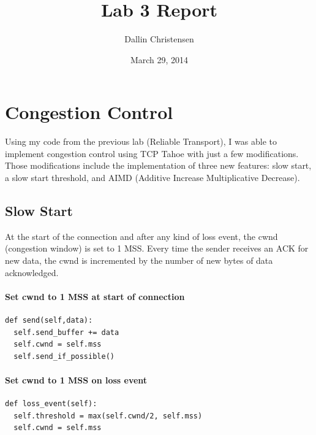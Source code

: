 \documentclass[11pt]{article}
\begin{document}
\lstset{
  language=Python,
  basicstyle=\small,          %
  keywordstyle=\bfseries,
  identifierstyle=,           %
  commentstyle=,              %
  stringstyle=\ttfamily,      %
  showstringspaces=false,     %
  numbers=left,
  numberstyle=\tiny,
  numbersep=5pt,
  frame=tb,
}

\title{Lab 3 Report}

\author{Dallin Christensen}

\date{March 29, 2014}

\maketitle

\section{Congestion Control}
Using my code from the previous lab (Reliable Transport), I was able to implement congestion control using TCP Tahoe with just a few modifications. Those modifications include the implementation of three new features: slow start, a slow start threshold, and AIMD (Additive Increase Multiplicative Decrease).

\subsection{Slow Start}
At the start of the connection and after any kind of loss event, the cwnd (congestion window) is set to 1 MSS. Every time the sender receives an ACK for new data, the cwnd is incremented by the number of new bytes of data acknowledged.
\paragraph{Set cwnd to 1 MSS at start of connection} \hspace{2mm}
\begin{lstlisting}
def send(self,data):
  self.send_buffer += data
  self.cwnd = self.mss
  self.send_if_possible()
\end{lstlisting}
\paragraph{Set cwnd to 1 MSS on loss event} \hspace{2mm}
\begin{lstlisting}
def loss_event(self):
  self.threshold = max(self.cwnd/2, self.mss)
  self.cwnd = self.mss
\end{lstlisting}
\end{document}
